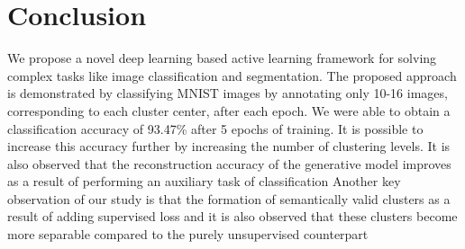 \documentclass{uai2021} %
\begin{document}
\section{Conclusion} \label{conclusion}
We propose a novel deep learning based active learning framework for solving complex tasks like image classification and segmentation.
The proposed approach is demonstrated by classifying MNIST images by annotating only 10-16 images, corresponding to each cluster center,  after each epoch.
We were able to obtain a classification accuracy of 93.47\% after 5 epochs of training.
It is possible to increase this accuracy further by increasing the number of clustering levels.
It is also observed that the reconstruction accuracy of the generative model improves as a result of performing an auxiliary task of classification
Another key observation of our study is that the formation of semantically valid clusters as a result of adding supervised loss and it is also observed that these clusters become more separable compared to the purely unsupervised counterpart
%
%
\end{document}
